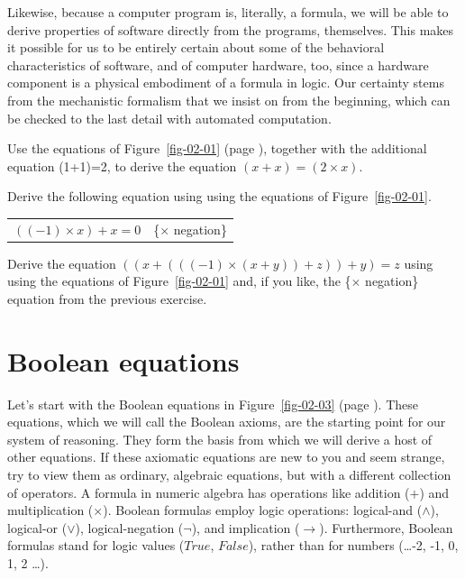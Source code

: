 Likewise, because a computer program is,
literally, a formula, we will be able to derive
properties of software directly from the programs, themselves.
This makes it possible for us to be entirely
certain about some of the behavioral characteristics of
software, and of computer hardware, too,
since a hardware component is a physical embodiment of a formula
in logic.
Our certainty stems from the mechanistic
formalism that we insist on from the beginning,
which can be checked to the last detail with automated computation.

\begin{ExerciseList}
\label{ex:ch02-intro}
\Exercise
Use the equations of Figure~\ref{fig-02-01} (page \pageref{fig-02-01}),
together with the additional equation (1+1)=2, to derive the equation $(x + x) = (2 \times x)$.

\Exercise
Derive the following equation
using using the equations of Figure~\ref{fig-02-01}.
\begin{center}
\begin{tabular}{ll}
$((-1) \times x) + x = 0$    & \{$\times$ negation\}
\end{tabular}
\end{center}

\Exercise
Derive the equation $((x + (((-1) \times (x + y)) + z)) + y) = z$
using using the equations of Figure~\ref{fig-02-01} and,
if you like,
the \{$\times$ negation\} equation from the previous exercise.
\end{ExerciseList}

\section{Boolean equations}
\label{sec:boolean-equations}
Let's start with the Boolean equations in
Figure~\ref{fig-02-03} (page \pageref{fig-02-03}).
These equations, which we will call the Boolean axioms,
are the starting point for our system of reasoning.
They form the basis from which we will derive
a host of other equations.
If these axiomatic equations are new to you and seem strange,
try to view them as ordinary,
algebraic equations, but with a different collection of operators.
A formula in numeric algebra has operations like addition
($+$) and multiplication ($\times$). Boolean formulas employ logic
operations: logical-and ($\wedge$), logical-or ($\vee$),
logical-negation ($\neg$), and implication ($\rightarrow$).
Furthermore, Boolean formulas stand for logic values
($True$, $False$), rather than for numbers (\dots -2, -1, 0, 1, 2 \dots).

